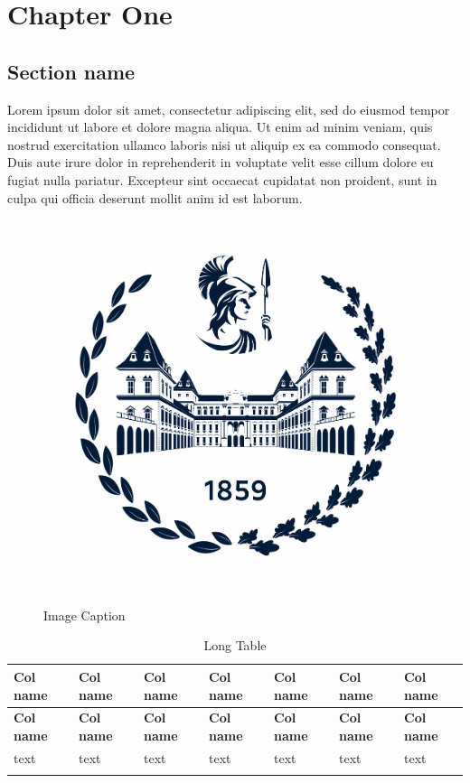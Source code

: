 \chapter{Chapter One}

\section{Section name}
Lorem ipsum dolor sit amet, consectetur adipiscing elit, sed do eiusmod tempor incididunt ut labore et dolore magna aliqua. Ut enim ad minim veniam, quis nostrud exercitation ullamco laboris nisi ut aliquip ex ea commodo consequat. Duis aute irure dolor in reprehenderit in voluptate velit esse cillum dolore eu fugiat nulla pariatur. Excepteur sint occaecat cupidatat non proident, sunt in culpa qui officia deserunt mollit anim id est laborum. \cite{IEEEexample:article_typical}

\begin{figure}
    \centering
    \includegraphics[width=0.5\linewidth]{images/polito_logo_2021_blu_cut.jpg}
    \caption{Image Caption}
    \label{fig:enter-label}
\end{figure}


\begin{longtable}{ | m{4em} | m{4em} | m{4em} | m{4em} | m{4em} | m{4em} | m{4em} | }
\hline
\textbf{Col name} & \textbf{Col name} & \textbf{Col name} & \textbf{Col name} & \textbf{Col name} & \textbf{Col name} & \textbf{Col name} \\
\hline
\endfirsthead
\hline
\textbf{Col name} & \textbf{Col name} & \textbf{Col name} & \textbf{Col name} & \textbf{Col name} & \textbf{Col name} & \textbf{Col name} \\
\hline
\endhead

text & text & text & text & text & text & text \\
\hline


\caption{Long Table}
\label{tab:GPS_ICD} \\
\end{longtable}